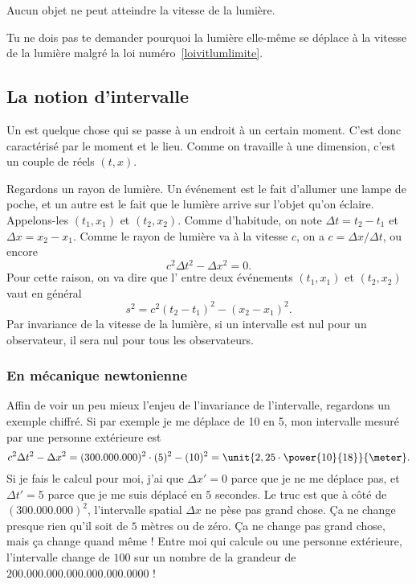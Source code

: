 \begin{loiphyz}\label{loivitlumlimite}
Aucun objet ne peut atteindre la vitesse de la lumière.
\end{loiphyz}

\begin{loiphyz}
Tu ne dois pas te demander pourquoi la lumière elle-même se déplace à la vitesse de la lumière malgré la loi numéro~\ref{loivitlumlimite}.
\end{loiphyz}

\subsection{La notion d'intervalle}


Un  est quelque chose qui se passe à un endroit à un certain moment. C'est donc caractérisé par le moment et le lieu. Comme on travaille à une dimension, c'est un couple de réels $(t,x)$.

Regardons un rayon de lumière. Un événement est le fait d'allumer une lampe de poche, et un autre est le fait que le lumière arrive sur l'objet qu'on éclaire. Appelons-les $(t_1,x_1)$ et $(t_2,x_2)$. Comme d'habitude, on note $\Delta t=t_2-t_1$ et $\Delta x=x_2-x_1$. Comme le rayon de lumière va à la vitesse $c$, on a $c=\Delta x/\Delta t$, ou encore
\[
  c^2\Delta t^2-\Delta x^2=0.
\]
Pour cette raison, on va dire que l' entre deux événements $(t_1,x_1)$ et $(t_2,x_2)$ vaut en général
\begin{equation}
 s^2=c^2(t_2-t_1)^2-(x_2-x_1)^2.
\end{equation}
Par invariance de la vitesse de la lumière, si un intervalle est nul pour un observateur, il sera nul pour tous les observateurs.


\subsubsection{En mécanique newtonienne}

Affin de voir un peu mieux l'enjeu de l'invariance de l'intervalle, regardons un exemple chiffré.  Si par exemple je me déplace de \unit{10}{\meter} en \unit{5}{\second}, mon intervalle mesuré par une personne extérieure est
\[
  c^2\Delta t^2-\Delta x^2=(300.000.000)^2\cdot (5)^2 - (10)^2=\unit{2,25\cdot \power{10}{18}}{\meter}.
\]
Si je fais le calcul pour moi, j'ai que $\Delta x'=0$ parce que je ne me déplace pas, et $\Delta t'=5$ parce que je me suis déplacé en $5$ secondes. Le truc est que à côté de $(300.000.000)^2$, l'intervalle spatial $\Delta x$ ne pèse pas grand chose. Ça ne change presque rien qu'il soit de $5$ mètres ou de zéro. Ça ne change pas grand chose, mais ça change quand même ! Entre moi qui calcule ou une personne extérieure, l'intervalle change de $100$ sur un nombre de la grandeur de $200.000.000.000.000.000.0000$ !

